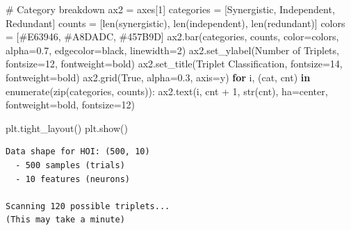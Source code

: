 \documentclass[
  11pt,
  letterpaper,
  oneside,
  openany]{book}
\newenvironment{Shaded}{\begin{snugshade}}{\end{snugshade}}
\newcommand{\BuiltInTok}[1]{\textcolor[rgb]{0.00,0.23,0.31}{#1}}
\newcommand{\CommentTok}[1]{\textcolor[rgb]{0.37,0.37,0.37}{#1}}
\newcommand{\ControlFlowTok}[1]{\textcolor[rgb]{0.00,0.23,0.31}{\textbf{#1}}}
\newcommand{\DecValTok}[1]{\textcolor[rgb]{0.68,0.00,0.00}{#1}}
\newcommand{\FloatTok}[1]{\textcolor[rgb]{0.68,0.00,0.00}{#1}}
\newcommand{\KeywordTok}[1]{\textcolor[rgb]{0.00,0.23,0.31}{\textbf{#1}}}
\newcommand{\NormalTok}[1]{\textcolor[rgb]{0.00,0.23,0.31}{#1}}
\newcommand{\OperatorTok}[1]{\textcolor[rgb]{0.37,0.37,0.37}{#1}}
\newcommand{\StringTok}[1]{\textcolor[rgb]{0.13,0.47,0.30}{#1}}
\newcommand{\VariableTok}[1]{\textcolor[rgb]{0.07,0.07,0.07}{#1}}
\begin{document}
\begin{Shaded}
\begin{Highlighting}[]
\CommentTok{\# Category breakdown}
\NormalTok{ax2 }\OperatorTok{=}\NormalTok{ axes[}\DecValTok{1}\NormalTok{]}
\NormalTok{categories }\OperatorTok{=}\NormalTok{ [}\StringTok{\textquotesingle{}Synergistic\textquotesingle{}}\NormalTok{, }\StringTok{\textquotesingle{}Independent\textquotesingle{}}\NormalTok{, }\StringTok{\textquotesingle{}Redundant\textquotesingle{}}\NormalTok{]}
\NormalTok{counts }\OperatorTok{=}\NormalTok{ [}\BuiltInTok{len}\NormalTok{(synergistic), }\BuiltInTok{len}\NormalTok{(independent), }\BuiltInTok{len}\NormalTok{(redundant)]}
\NormalTok{colors }\OperatorTok{=}\NormalTok{ [}\StringTok{\textquotesingle{}\#E63946\textquotesingle{}}\NormalTok{, }\StringTok{\textquotesingle{}\#A8DADC\textquotesingle{}}\NormalTok{, }\StringTok{\textquotesingle{}\#457B9D\textquotesingle{}}\NormalTok{]}
\NormalTok{ax2.bar(categories, counts, color}\OperatorTok{=}\NormalTok{colors, alpha}\OperatorTok{=}\FloatTok{0.7}\NormalTok{, edgecolor}\OperatorTok{=}\StringTok{\textquotesingle{}black\textquotesingle{}}\NormalTok{, linewidth}\OperatorTok{=}\DecValTok{2}\NormalTok{)}
\NormalTok{ax2.set\_ylabel(}\StringTok{\textquotesingle{}Number of Triplets\textquotesingle{}}\NormalTok{, fontsize}\OperatorTok{=}\DecValTok{12}\NormalTok{, fontweight}\OperatorTok{=}\StringTok{\textquotesingle{}bold\textquotesingle{}}\NormalTok{)}
\NormalTok{ax2.set\_title(}\StringTok{\textquotesingle{}Triplet Classification\textquotesingle{}}\NormalTok{, fontsize}\OperatorTok{=}\DecValTok{14}\NormalTok{, fontweight}\OperatorTok{=}\StringTok{\textquotesingle{}bold\textquotesingle{}}\NormalTok{)}
\NormalTok{ax2.grid(}\VariableTok{True}\NormalTok{, alpha}\OperatorTok{=}\FloatTok{0.3}\NormalTok{, axis}\OperatorTok{=}\StringTok{\textquotesingle{}y\textquotesingle{}}\NormalTok{)}
\ControlFlowTok{for}\NormalTok{ i, (cat, cnt) }\KeywordTok{in} \BuiltInTok{enumerate}\NormalTok{(}\BuiltInTok{zip}\NormalTok{(categories, counts)):}
\NormalTok{    ax2.text(i, cnt }\OperatorTok{+} \DecValTok{1}\NormalTok{, }\BuiltInTok{str}\NormalTok{(cnt), ha}\OperatorTok{=}\StringTok{\textquotesingle{}center\textquotesingle{}}\NormalTok{, fontweight}\OperatorTok{=}\StringTok{\textquotesingle{}bold\textquotesingle{}}\NormalTok{, fontsize}\OperatorTok{=}\DecValTok{12}\NormalTok{)}

\NormalTok{plt.tight\_layout()}
\NormalTok{plt.show()}
\end{Highlighting}
\end{Shaded}

\begin{verbatim}
Data shape for HOI: (500, 10)
  - 500 samples (trials)
  - 10 features (neurons)

Scanning 120 possible triplets...
(This may take a minute)
\end{verbatim}
\end{document}
